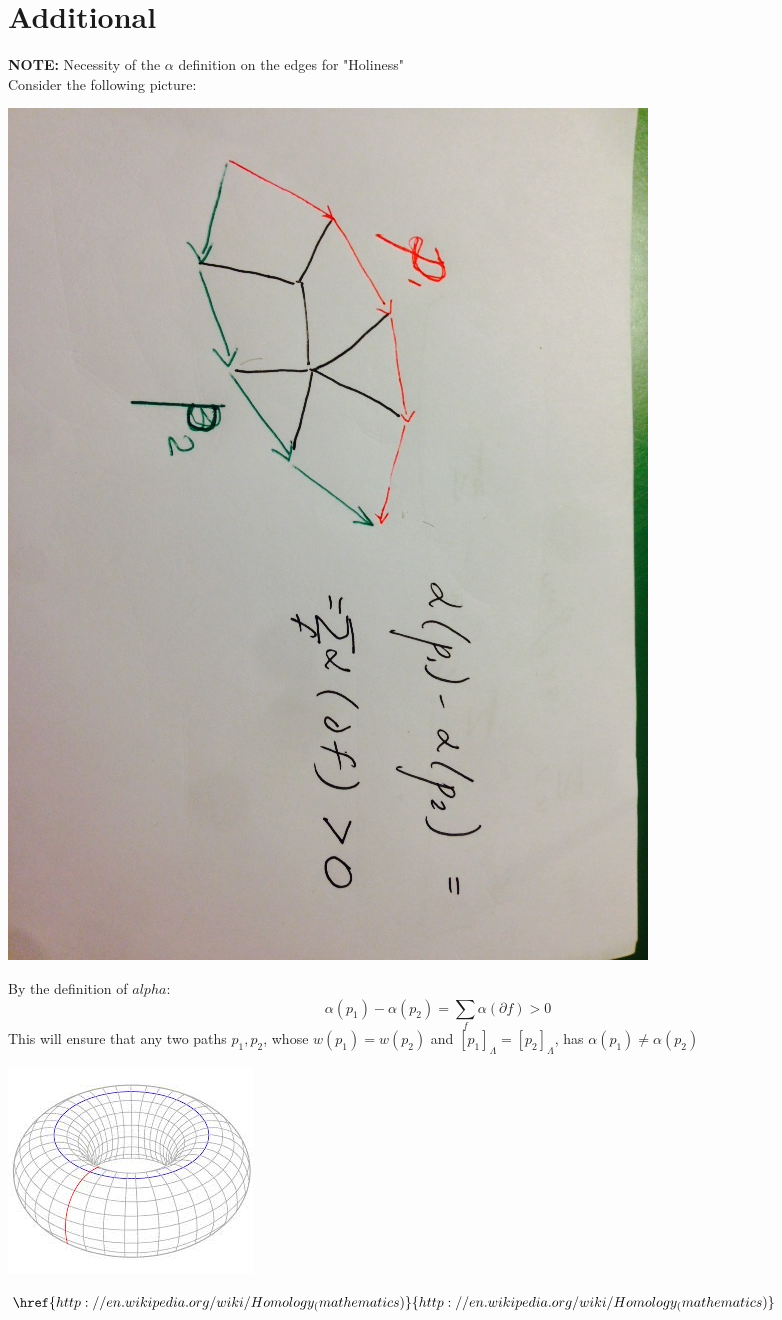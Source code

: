 \documentclass{article}
\begin{document}
\section{Additional}
\textbf{NOTE: } Necessity of the $\alpha$ definition on the edges for "Holiness" \\
Consider the following picture:
\begin{center}
\includegraphics[angle = 90, scale = 0.3]{alphaNec.jpg}
\end{center}
By the definition of $alpha$:
\[\alpha(p_1) - \alpha(p_2) = \sum_f \alpha(\partial f) > 0\]
This will ensure that any two paths $p_1, p_2$, whose $w(p_1) = w(p_2)$ and 
  $[p_1]_{\Lambda} = [p_2]_{\Lambda}$, has $\alpha(p_1) \neq \alpha(p_2)$

\begin{center}
\includegraphics{torus.jpg}
\end{center}
$\href{http://en.wikipedia.org/wiki/Homology_(mathematics)}{http://en.wikipedia.org/wiki/Homology_(mathematics)}$
\end{document}

